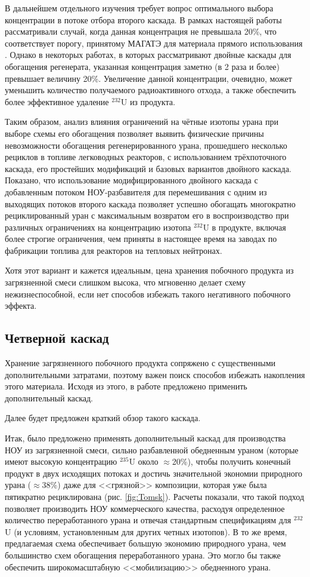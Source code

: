 В дальнейшем отдельного изучения требует вопрос оптимального выбора концентрации в потоке отбора второго каскада. В рамках настоящей работы рассматривали случай, когда данная концентрация не превышала 20\%, что соответствует порогу, принятому МАГАТЭ для материала прямого использования \cite{alekseevConceptUseRecycled2010}. Однако в некоторых работах, в которых рассматривают двойные каскады для обогащения регенерата, указанная концентрация заметно (в 2 раза и более) превышает величину 20\%. Увеличение данной концентрации, очевидно, может уменьшить количество получаемого радиоактивного отхода, а также обеспечить более эффективное удаление $^{232}$U из продукта.

Таким образом, анализ влияния ограничений на чётные изотопы урана при выборе схемы его обогащения позволяет выявить физические причины невозможности обогащения регенерированного урана, прошедшего несколько рециклов в топливе легководных реакторов, с использованием трёхпоточного каскада, его простейших модификаций и базовых вариантов двойного каскада. 
Показано, что использование модифицированного двойного каскада с добавленным потоком НОУ-разбавителя для перемешивания с одним из выходящих потоков второго каскада позволяет успешно обогащать многократно рециклированный уран с максимальным возвратом его в воспроизводство при различных ограничениях на концентрацию изотопа $^{232}$U в продукте, включая более строгие ограничения, чем приняты в настоящее время на заводах по фабрикации топлива для реакторов на тепловых нейтронах.


Хотя этот вариант и кажется идеальным, цена хранения побочного продукта из загрязненной смеси слишком высока, что мгновенно делает схему нежизнеспособной, если нет способов избежать такого негативного побочного эффекта.

\subsection{Четверной каскад}
Хранение загрязненного побочного продукта сопряжено с существенными дополнительными затратами, поэтому важен поиск способов избежать накопления этого материала.
Исходя из этого, в работе \cite{smirnovMethodEnrichReprocessed2019} предложено применить дополнительный каскад.

Далее будет предложен краткий обзор такого каскада.

Итак, было предложено применять дополнительный каскад для производства НОУ из загрязненной смеси, сильно разбавленной обедненным ураном (которые имеют высокую концентрацию $^{235}$U около $\approx$20\%), чтобы получить конечный продукт в двух исходящих потоках и достичь значительной экономии природного урана ($\approx$38\%) даже для <<грязной>> композиции, которая уже была пятикратно рециклирована (рис. \ref{fig:Tomsk}). Расчеты показали, что такой подход позволяет производить НОУ коммерческого качества, расходуя определенное количество переработанного урана и отвечая стандартным спецификациям для  $^{232}$U (и условиям, установленным для других четных изотопов). В то же время, предлагаемая схема обеспечивает большую экономию природного урана, чем большинство схем обогащения переработанного урана. Это могло бы также обеспечить широкомасштабную <<мобилизацию>> обедненного урана.


